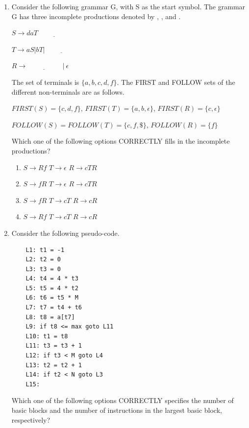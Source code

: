 \documentclass[a4paper, 11pt]{article}
\begin{document}
\begin{enumerate}
    \item Consider the following grammar G, with S as the start symbol. The grammar G has three incomplete productions denoted by , , and .
    
    $S \rightarrow daT \underline{\hspace{2cm}}$ 
    
    $T \rightarrow aS|bT| \underline{\hspace{2cm}}$ 
    
    $R \rightarrow \underline{\hspace{2cm}}$  $|\ \epsilon$
    
    The set of terminals is $\{a, b, c, d, f\}$. The FIRST and FOLLOW sets of the different non-terminals are as follows.
    
    $FIRST(S) = \{c, d, f\}$, $FIRST(T) = \{a, b, \epsilon\}$, $FIRST(R) = \{c, \epsilon\}$
    
    $FOLLOW(S) = FOLLOW(T) = \{c, f, \$\}$, $FOLLOW(R) = \{f\}$
    
    Which one of the following options CORRECTLY fills in the incomplete productions?
    
    \begin{enumerate}
        \item {} $S \rightarrow Rf$ \quad {} $T \rightarrow \epsilon$ \quad {} $R \rightarrow cTR$
        \item {} $S \rightarrow fR$ \quad {} $T \rightarrow \epsilon$ \quad {} $R \rightarrow cTR$
        \item {} $S \rightarrow fR$ \quad {} $T \rightarrow cT$ \quad {} $R \rightarrow cR$
        \item {} $S \rightarrow Rf$ \quad {} $T \rightarrow cT$ \quad {} $R \rightarrow cR$
    \end{enumerate}
    \hfill{}

    \item Consider the following pseudo-code.
    \begin{verbatim}
    L1: t1 = -1
    L2: t2 = 0
    L3: t3 = 0
    L4: t4 = 4 * t3
    L5: t5 = 4 * t2
    L6: t6 = t5 * M
    L7: t7 = t4 + t6
    L8: t8 = a[t7]
    L9: if t8 <= max goto L11
    L10: t1 = t8
    L11: t3 = t3 + 1
    L12: if t3 < M goto L4
    L13: t2 = t2 + 1
    L14: if t2 < N goto L3
    L15:
    \end{verbatim}
    Which one of the following options CORRECTLY specifies the number of basic blocks and the number of instructions in the largest basic block, respectively?


\end{enumerate}
\end{document}
